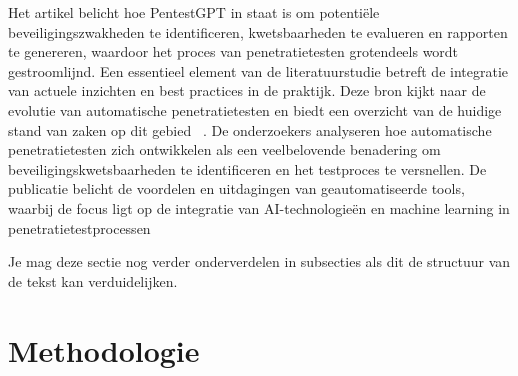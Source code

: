 Het artikel belicht hoe PentestGPT in
staat is om potentiële beveiligingszwakheden te
identificeren, kwetsbaarheden te evalueren en rapporten
te genereren, waardoor het proces van penetratietesten
grotendeels wordt gestroomlijnd.
Een essentieel element van de literatuurstudie
betreft de integratie van actuele inzichten en
best practices in de praktijk. Deze bron kijkt naar
de evolutie van automatische penetratietesten en
biedt een overzicht van de huidige stand van zaken
op dit gebied ~\autocite{AbuDabaseh2018}. De onderzoekers analyseren hoe automatische
penetratietesten zich ontwikkelen als een
veelbelovende benadering om beveiligingskwetsbaarheden
te identificeren en het testproces te
versnellen. De publicatie belicht de voordelen en
uitdagingen van geautomatiseerde tools, waarbij
de focus ligt op de integratie van AI-technologieën
en machine learning in penetratietestprocessen

Je mag deze sectie nog verder onderverdelen in subsecties als dit de structuur van de tekst kan verduidelijken.

\section{Methodologie}%
\label{sec:methodologie}

